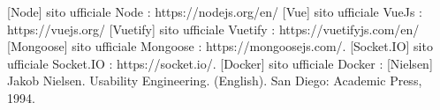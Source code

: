 \documentclass{report}
\begin{document}


[Node] sito ufficiale Node : https://nodejs.org/en/
[Vue] sito ufficiale VueJs : https://vuejs.org/
[Vuetify] sito ufficiale Vuetify : https://vuetifyjs.com/en/
[Mongoose] sito ufficiale Mongoose : https://mongoosejs.com/.
[Socket.IO] sito ufficiale Socket.IO : https://socket.io/.
[Docker] sito ufficiale Docker :
[Nielsen] Jakob Nielsen. Usability Engineering. (English). San Diego: Academic Press,
1994.
\end{document}
